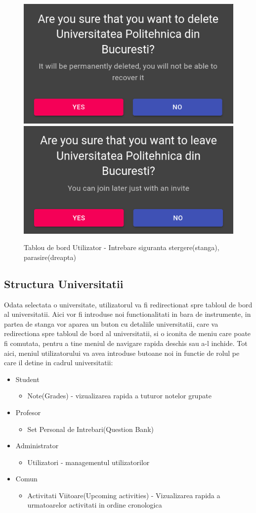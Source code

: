 \documentclass[12pt, a4paper, oneside, romanian]{teza-upb}
\begin{document}
\begin{figure}[H]
\centering
\includegraphics*[width=0.45\columnwidth]{tablou-de-bord-utilizator-intrebare-siguranta-stergere}
\includegraphics*[width=0.45\columnwidth]{tablou-de-bord-utilizator-intrebare-siguranta-parasire}
\caption{Tablou de bord Utilizator - Intrebare siguranta stergere(stanga), parasire(dreapta)}
\label{tablou-de-bord-utilizator-intrebare-siguranta}
\end{figure}

\subsection{Structura Universitatii}

Odata selectata o universitate, utilizatorul va fi redirectionat spre tabloul de bord al universitatii. Aici vor fi introduse noi functionalitati in bara de instrumente, in partea de stanga vor aparea un buton cu detaliile universitatii, care va redirectiona spre tabloul de bord al universitatii, si o iconita de meniu care poate fi comutata, pentru a tine meniul de navigare rapida deschis sau a-l inchide. Tot aici, meniul utilizatorului va avea introduse butoane noi in functie de rolul pe care il detine in cadrul universitatii:
\begin{itemize}
	\item Student
		\begin{itemize}
			\item Note(Grades) - vizualizarea rapida a tuturor notelor grupate
		\end{itemize}
	\item Profesor
		\begin{itemize}
			\item Set Personal de Intrebari(Question Bank)
		\end{itemize}
	\item Administrator
		\begin{itemize}
			\item Utilizatori - managementul utilizatorilor
		\end{itemize}
	\item Comun
		\begin{itemize}
			\item Activitati Viitoare(Upcoming activities) - Vizualizarea rapida a urmatoarelor activitati in ordine cronologica
		\end{itemize}
\end{itemize}
\end{document}
